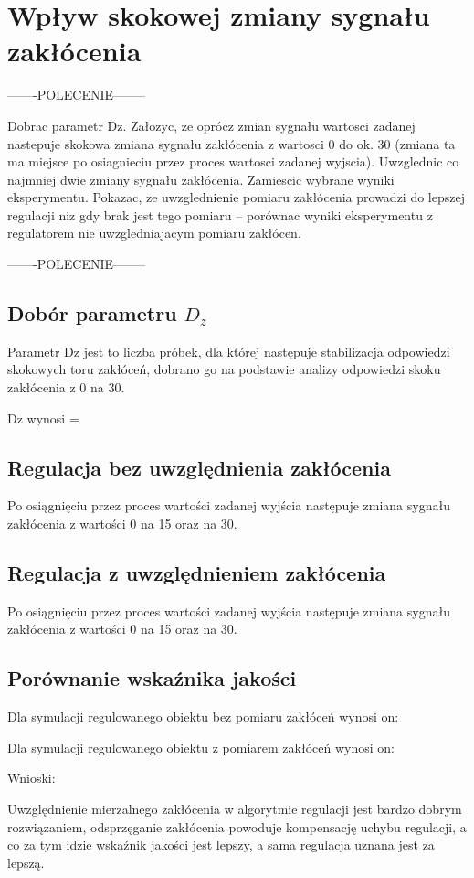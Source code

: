 \section{Wpływ skokowej zmiany sygnału zakłócenia}

-------POLECENIE--------

Dobrac parametr Dz. Załozyc, ze oprócz zmian sygnału wartosci zadanej nastepuje
skokowa zmiana sygnału zakłócenia z wartosci 0 do ok. 30 (zmiana ta ma miejsce
po osiagnieciu przez proces wartosci zadanej wyjscia). Uwzglednic co najmniej
dwie zmiany sygnału zakłócenia. Zamiescic wybrane wyniki eksperymentu. Pokazac,
ze uwzglednienie pomiaru zakłócenia prowadzi do lepszej regulacji niz gdy brak jest
tego pomiaru – porównac wyniki eksperymentu z regulatorem nie uwzgledniajacym
pomiaru zakłócen.

-------POLECENIE--------


\subsection{Dobór parametru $D_z$}

Parametr Dz jest to liczba próbek, dla której następuje stabilizacja odpowiedzi
skokowych toru zakłóceń, 
dobrano go na podstawie analizy odpowiedzi skoku zakłócenia z 0 na 30.

Dz wynosi =

\subsection{Regulacja bez uwzględnienia zakłócenia}

Po osiągnięciu przez proces wartości zadanej wyjścia następuje zmiana sygnału
zakłócenia z wartości 0 na 15 oraz na 30.

\subsection{Regulacja z uwzględnieniem zakłócenia}

Po osiągnięciu przez proces wartości zadanej wyjścia następuje zmiana sygnału
zakłócenia z wartości 0 na 15 oraz na 30.

\subsection{Porównanie wskaźnika jakości}

Dla symulacji regulowanego obiektu bez pomiaru zakłóceń wynosi on:

Dla symulacji regulowanego obiektu z pomiarem zakłóceń wynosi on:

Wnioski: 

Uwzględnienie mierzalnego zakłócenia w algorytmie regulacji jest bardzo
dobrym rozwiązaniem, 
odsprzęganie zakłócenia powoduje kompensację uchybu regulacji, 
a co za tym idzie wskaźnik jakości jest lepszy, 
a sama regulacja uznana jest za lepszą.
